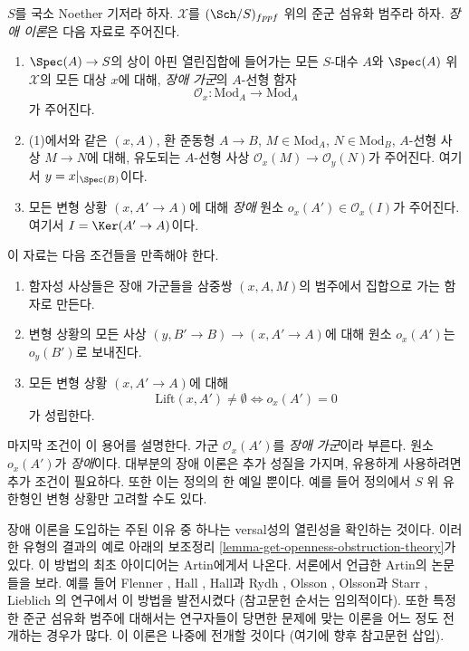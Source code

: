 \begin{definition}
\label{definition-obstruction-theory}
$S$를 국소 Noether 기저라 하자. $\mathcal{X}$를
$(\Sch/S)_{fppf}$ 위의 준군 섬유화 범주라 하자.
{\it 장애 이론}은 다음 자료로 주어진다.
\begin{enumerate}
\item $\Spec(A) \to S$의 상이 아핀 열린집합에 들어가는 모든
$S$-대수 $A$와 $\Spec(A)$ 위 $\mathcal{X}$의 모든 대상 $x$에 대해,
{\it 장애 가군}의 $A$-선형 함자
$$
\mathcal{O}_x : \text{Mod}_A \to \text{Mod}_A
$$
가 주어진다.
\item (1)에서와 같은 $(x, A)$, 환 준동형 $A \to B$,
$M \in \text{Mod}_A$, $N \in \text{Mod}_B$, $A$-선형 사상
$M \to N$에 대해, 유도되는 $A$-선형 사상
$\mathcal{O}_x(M) \to \mathcal{O}_y(N)$가 주어진다.
여기서 $y = x|_{\Spec(B)}$이다.
\item 모든 변형 상황 $(x, A' \to A)$에 대해 {\it 장애} 원소
$o_x(A') \in \mathcal{O}_x(I)$가 주어진다.
여기서 $I = \Ker(A' \to A)$이다.
\end{enumerate}
이 자료는 다음 조건들을 만족해야 한다.
\begin{enumerate}
\item[(i)] 함자성 사상들은 장애 가군들을 삼중쌍 $(x, A, M)$의
범주에서 집합으로 가는 함자로 만든다.
\item[(ii)] 변형 상황의 모든 사상
$(y, B' \to B) \to (x, A' \to A)$에 대해 원소 $o_x(A')$는
$o_y(B')$로 보내진다.
\item[(iii)] 모든 변형 상황 $(x, A' \to A)$에 대해
$$
\text{Lift}(x, A') \not = \emptyset
\Leftrightarrow
o_x(A') = 0
$$
가 성립한다.
\end{enumerate}
\end{definition}

\noindent
마지막 조건이 이 용어를 설명한다.
가군 $\mathcal{O}_x(A')$를 {\it 장애 가군}이라 부른다.
원소 $o_x(A')$가 {\it 장애}이다.
대부분의 장애 이론은 추가 성질을 가지며, 유용하게 사용하려면 추가
조건이 필요하다. 또한 이는 정의의 한 예일 뿐이다. 예를 들어 정의에서
$S$ 위 유한형인 변형 상황만 고려할 수도 있다.

\medskip\noindent
장애 이론을 도입하는 주된 이유 중 하나는 versal성의 열린성을 확인하는
것이다. 이러한 유형의 결과의 예로 아래의 보조정리
\ref{lemma-get-openness-obstruction-theory}가 있다.
이 방법의 최초 아이디어는 Artin에게서 나온다. 서론에서 언급한 Artin의
논문들을 보라. 예를 들어 Flenner \cite{Flenner}, Hall \cite{Hall-coherent},
Hall과 Rydh \cite{rydh_axioms}, Olsson \cite{olsson_deformation},
Olsson과 Starr \cite{olsson-starr}, Lieblich \cite{lieblich-complexes}의
연구에서 이 방법을 발전시켰다 (참고문헌 순서는 임의적이다).
또한 특정한 준군 섬유화 범주에 대해서는 연구자들이 당면한 문제에 맞는
이론을 어느 정도 전개하는 경우가 많다.
이 이론은 나중에 전개할 것이다 (여기에 향후 참고문헌 삽입).

